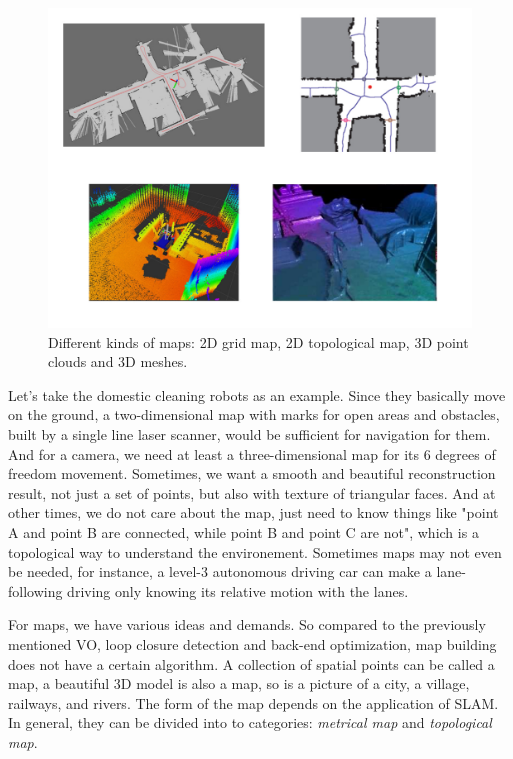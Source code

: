 \begin{figure}
	\centering
	\includegraphics[width=1.0\textwidth]{./resources/whatIsSLAM/map.pdf}
	\caption{Different kinds of maps: 2D grid map, 2D topological map, 3D point clouds and 3D meshes.}
	\label{fig:mapping}
\end{figure}

Let's take the domestic cleaning robots as an example. Since they basically move on the ground, a two-dimensional map with marks for open areas and obstacles, built by a single line laser scanner, would be sufficient for navigation for them. And for a camera, we need at least a three-dimensional map for its 6 degrees of freedom movement. Sometimes, we want a smooth and beautiful reconstruction result, not just a set of points, but also with texture of triangular faces. And at other times, we do not care about the map, just need to know things like "point A and point B are connected, while point B and point C are not", which is a topological way to understand the environement. Sometimes maps may not even be needed, for instance, a level-3 autonomous driving car can make a lane-following driving only knowing its relative motion with the lanes.

For maps, we have various ideas and demands. So compared to the previously mentioned VO, loop closure detection and back-end optimization, map building does not have a certain algorithm. A collection of spatial points can be called a map, a beautiful 3D model is also a map, so is a picture of a city, a village, railways, and rivers. The form of the map depends on the application of SLAM. In general, they can be divided into to categories: \emph{metrical map} and \emph{topological map}.

